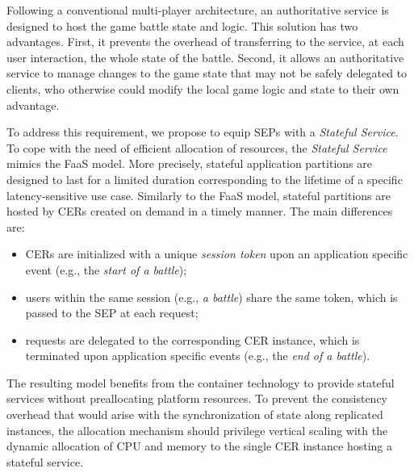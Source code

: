 Following a conventional multi-player architecture, an authoritative service is designed to host the game battle state and logic. This solution has two advantages. First, it prevents the overhead of transferring to the service, at each user interaction, the whole state of the battle. Second, it allows an authoritative service to manage changes to the game state that may not be safely delegated to clients, who otherwise could modify the local game logic and state to their own advantage.


To address this requirement, we propose to equip SEPs with a \textit{Stateful Service}. 
To cope with the need of efficient allocation of resources, the \textit{Stateful Service} mimics the FaaS model. More precisely, stateful application partitions are designed to last for a limited duration corresponding to the lifetime of a specific latency-sensitive use case. Similarly to the FaaS model, stateful partitions are hosted by CERs created on demand in a timely manner. The main differences are:

\begin{itemize}
    
    \item CERs are initialized with a unique \textit{session token} upon an application specific event (e.g., the \textit{start of a battle});
    
    \item users within the same session (e.g., \textit{a battle}) share the same token, which is passed to the SEP at each request; %
    
    \item requests are delegated to the corresponding CER instance, which is terminated upon application specific events (e.g., the \textit{end of a battle}).
    
\end{itemize}

The resulting model benefits from the container technology to provide stateful services without preallocating platform resources. 
To prevent the consistency overhead that would arise with the synchronization of state along replicated instances, the allocation mechanism should privilege vertical scaling with the dynamic allocation of CPU and memory to the single CER instance hosting a stateful service. 

